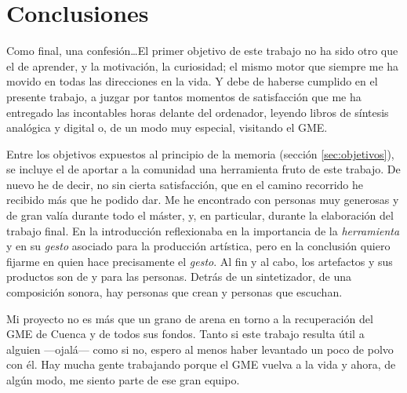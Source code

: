 \chapter[Conclusiones]{Conclusiones}


Como final, una confesión\dots El primer objetivo de este trabajo no ha sido otro que el de aprender, y la motivación, la curiosidad; el mismo motor que siempre me ha movido en todas las direcciones en la vida. Y debe de haberse cumplido en el presente trabajo, a juzgar por tantos momentos de satisfacción que me ha entregado las incontables horas delante del ordenador, leyendo libros de síntesis analógica y digital o, de un modo muy especial, visitando el GME. 

Entre los objetivos expuestos al principio de la memoria (sección \ref{sec:objetivos}), se incluye el de aportar a la comunidad una herramienta fruto de este trabajo. De nuevo he de decir, no sin cierta satisfacción, que en el camino recorrido he recibido más que he podido dar. Me he encontrado con personas muy generosas y de gran valía durante todo el máster, y, en particular, durante la elaboración del trabajo final. En la introducción reflexionaba en la importancia de la \textit{herramienta} y en su \textit{gesto} asociado para la producción artística, pero en la conclusión quiero fijarme en quien hace precisamente el \textit{gesto}. Al fin y al cabo, los artefactos y sus productos son de y para las personas. Detrás de un sintetizador, de una composición sonora, hay personas que crean y personas que escuchan.

Mi proyecto no es más que un grano de arena en torno a la recuperación del GME de Cuenca y de todos sus fondos. Tanto si este trabajo resulta útil a alguien ---ojalá--- como si no, espero al menos haber levantado un poco de polvo con él. Hay mucha gente trabajando porque el GME vuelva a la vida y ahora, de algún modo, me siento parte de ese gran equipo. 



